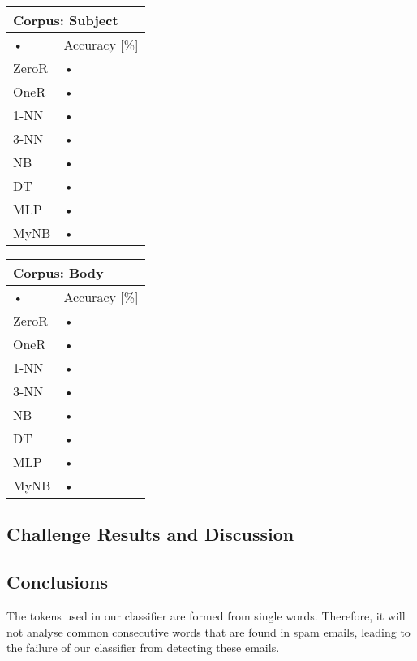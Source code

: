 \documentclass[10pt, a4paper]{article}
\begin{document}
\begin{tabular}{|l|l|}
\hline 
\multicolumn{2}{|l|}{Corpus: Subject} \\ 
\hline 
• & Accuracy [\%] \\ 
\hline 
ZeroR & • \\ 
\hline 
OneR & • \\ 
\hline 
1-NN & • \\ 
\hline 
3-NN & • \\ 
\hline 
NB & • \\ 
\hline 
DT & • \\ 
\hline 
MLP & • \\ 
\hline 
MyNB & • \\ 
\hline 
\end{tabular} 

\begin{tabular}{|l|l|}
\hline 
\multicolumn{2}{|l|}{Corpus: Body} \\ 
\hline 
• & Accuracy [\%] \\ 
\hline 
ZeroR & • \\ 
\hline 
OneR & • \\ 
\hline 
1-NN & • \\ 
\hline 
3-NN & • \\ 
\hline 
NB & • \\ 
\hline 
DT & • \\ 
\hline 
MLP & • \\ 
\hline 
MyNB & • \\ 
\hline 
\end{tabular} 


\subsection*{Challenge Results and Discussion}

\subsection*{Conclusions}

The tokens used in our classifier are formed from single words. Therefore, it will not analyse common consecutive words that are found in spam emails, leading to the failure of our classifier from detecting these emails. 
\end{document}
